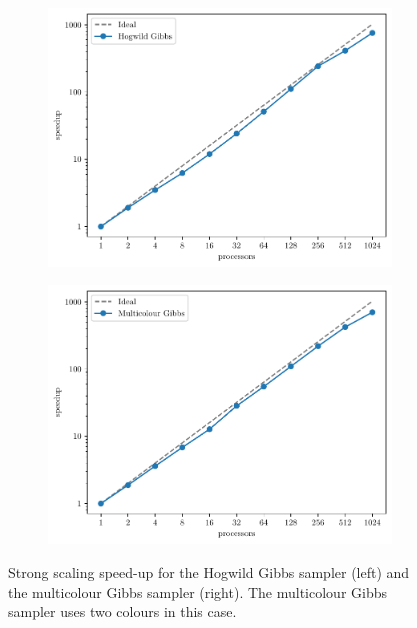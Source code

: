 \documentclass[
fontsize=11pt,
paper=a4,
numbers=noenddot
]{scrartcl}
\begin{document}
\begin{figure}[htbp]
    \centering
    \begin{subfigure}[b]{0.49\textwidth}
        \centering
        \includegraphics[width=\textwidth]{plots/strong_scaling_hogwild_4097x4097.pdf}
    \end{subfigure}
    \hfill
    \begin{subfigure}[b]{0.49\textwidth}
        \centering
        \includegraphics[width=\textwidth]{plots/strong_scaling_gibbs_4097x4097.pdf}
      \end{subfigure}
      \caption{Strong scaling speed-up for the Hogwild Gibbs sampler (left) and the multicolour Gibbs sampler (right). The multicolour Gibbs sampler uses two colours in this case.}
    \label{fig:2d_structured_ss}
\end{figure}
\end{document}
